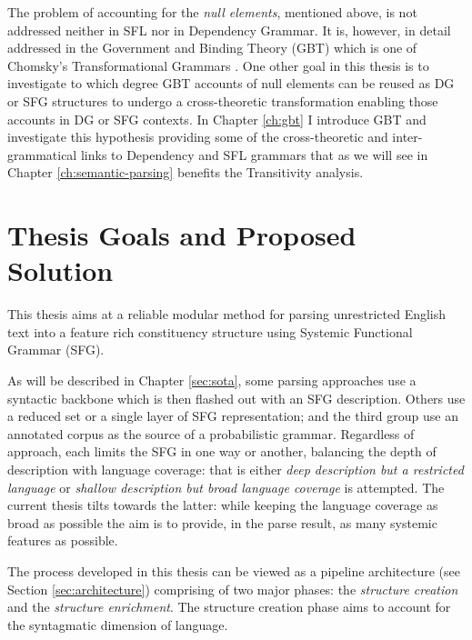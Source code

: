 The problem of accounting for the \textit{null elements}, mentioned above, is not addressed neither in SFL nor in Dependency Grammar. It is, however, in detail addressed in the Government and Binding Theory (GBT) \citep{Chomsky81,Haegeman1991} which is one of Chomsky's Transformational Grammars \citep{Chomsky1957}. One other goal in this thesis is to investigate to which degree GBT accounts of null elements can be reused as DG or SFG structures to undergo a cross-theoretic transformation enabling those accounts in DG or SFG contexts. In Chapter \ref{ch:gbt} I introduce GBT and investigate this hypothesis providing some of the cross-theoretic and inter-grammatical links to Dependency and SFL grammars that as we will see in Chapter \ref{ch:semantic-parsing} benefits the Transitivity analysis.


\section{Thesis Goals and Proposed Solution}
\label{sec:solution}

This thesis aims at a reliable modular method for parsing unrestricted English text into a feature rich constituency structure using Systemic Functional Grammar (SFG).

As will be described in Chapter \ref{sec:sota}, some parsing approaches use a syntactic backbone which is then flashed out with an SFG description. Others use a reduced set or a single layer of SFG representation; and the third group use an annotated corpus as the source of a probabilistic grammar. Regardless of approach, each limits the SFG in one way or another, balancing the depth of description with language coverage: that is either \textit{deep description but a restricted language} or \textit{shallow description but broad language coverage} is attempted. The current thesis tilts towards the latter: while keeping the language coverage as broad as possible the aim is to provide, in the parse result, as many systemic features as possible.

The process developed in this thesis can be viewed as a pipeline architecture (see Section \ref{sec:architecture}) comprising of two major phases: the \textit{structure creation} and the \textit{structure enrichment}. The structure creation phase aims to account for the syntagmatic dimension of language. 

